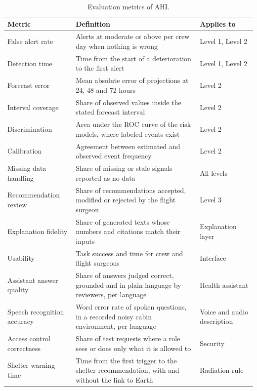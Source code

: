 \begin{table}[htbp]
\centering
\vspace{0.8em}
\caption{Evaluation metrics of AHI.}
\label{tab:checks}
\small
\begin{tabular}{p{4.0cm}p{6.0cm}p{4.0cm}}
\hline
\textbf{Metric} & \textbf{Definition} & \textbf{Applies to} \\
\hline
False alert rate & Alerts at moderate or above per crew day when nothing is wrong & Level 1, Level 2 \\
Detection time & Time from the start of a deterioration to the first alert & Level 1, Level 2 \\
Forecast error & Mean absolute error of projections at 24, 48 and 72 hours & Level 2 \\
Interval coverage & Share of observed values inside the stated forecast interval & Level 2 \\
Discrimination & Area under the ROC curve of the risk models, where labeled events exist & Level 2 \\
Calibration & Agreement between estimated and observed event frequency & Level 2 \\
Missing data handling & Share of missing or stale signals reported as no data & All levels \\
Recommendation review & Share of recommendations accepted, modified or rejected by the flight surgeon & Level 3 \\
Explanation fidelity & Share of generated texts whose numbers and citations match their inputs & Explanation layer \\
Usability & Task success and time for crew and flight surgeons & Interface \\
Assistant answer quality & Share of answers judged correct, grounded and in plain language by reviewers, per language & Health assistant \\
Speech recognition accuracy & Word error rate of spoken questions, in a recorded noisy cabin environment, per language & Voice and audio description \\
Access control correctness & Share of test requests where a role sees or does only what it is allowed to & Security \\
Shelter warning time & Time from the first trigger to the shelter recommendation, with and without the link to Earth & Radiation rule \\
\hline
\end{tabular}
\vspace{1.2em}
\end{table}

